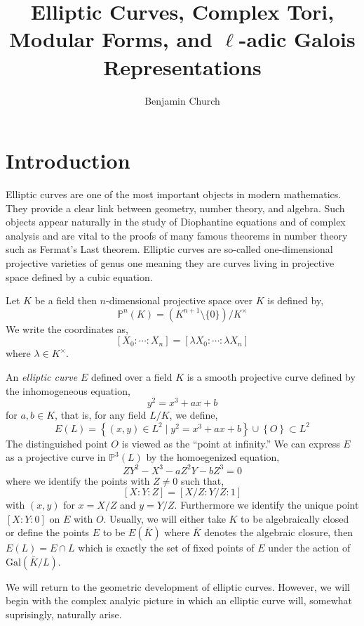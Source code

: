 \documentclass{article}
\title{Elliptic Curves, Complex Tori, Modular Forms, and $\ell$-adic Galois Representations}
\author{Benjamin Church}
\newcommand{\Gal}[1]{\mathrm{Gal}\left( #1 \right)}
\theoremstyle{definition}
\newenvironment{definition}[1][Definition:]{\begin{trivlist}
\item[\hskip \labelsep {\bfseries #1}]}{\end{trivlist}}
\renewcommand{\P}[2]{\mathbb{P}^{#1} \left( #2 \right)}
\begin{document}
\maketitle

\tableofcontents

\newpage

\section{Introduction}

Elliptic curves are one of the most important objects in modern mathematics. They provide a clear link between geometry, number theory, and algebra. Such objects appear naturally in the study of Diophantine equations and of complex analysis and are vital to the proofs of many famous theorems in number theory such as Fermat's Last theorem. Elliptic curves are so-called one-dimensional projective varieties of genus one meaning they are curves living in projective space defined by a cubic equation.

\begin{definition}
Let $K$ be a field then $n$-dimensional projective space over $K$ is defined by,
\[ \P{n}{K} = (K^{n+1} \setminus \{ 0 \}) / K^{\times} \]
We write the coordinates as,
\[ [X_0 : \cdots : X_n] = [\lambda X_0 : \cdots : \lambda X_n] \]
where $\lambda \in K^\times$.
\end{definition}

\begin{definition}
An \textit{elliptic curve} $E$ defined over a field $K$ is a smooth projective curve defined by the inhomogeneous equation,
\[ y^2 = x^3 + a x + b \]
for $a,b \in K$, that is, for any field $L / K$, we define,
\[ E(L) = \left\{ (x,y) \in L^2 \mid y^2 = x^3 + ax + b \right\} \cup \left\{ O \right\} \subset L^2 \]
The distinguished point $O$ is viewed as the ``point at infinity.'' We can express $E$ as a projective curve in $\P{3}{L}$ by the homoegenized equation,
\[ ZY^2 - X^3 - a Z^2 Y - b Z^3 = 0 \]
where we identify the points with $Z \neq 0$ such that,
\[ [X : Y : Z] = [ X/Z : Y/ Z : 1]  \]
with $(x, y)$ for $x = X/Z$ and $y = Y/Z$. Furthermore we identify the unique point $[X : Y : 0]$ on $E$ with $O$. 
Usually, we will either take $K$ to be algebraically closed or define the points $E$ to be $E(\bar{K})$ where $\bar{K}$ denotes the algebraic closure, then $E(L) = E \cap L$ which is exactly the set of fixed points of $E$ under the action of $\Gal{\bar{K}/L}$. 
\end{definition}
We will return to the geometric development of elliptic curves. However, we will begin with the complex analyic picture in which an elliptic curve will, somewhat suprisingly, naturally arise. 
\end{document}
